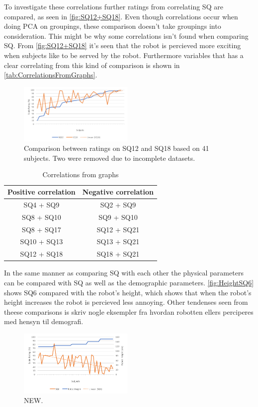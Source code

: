 To investigate these correlations further ratings from correlating SQ are compared, as seen in \autoref{fig:SQ12+SQ18}. Even though correlations occur when doing PCA on groupings, these comparison doesn't take groupings into consideration. This might be why some correlations isn't found when comparing SQ. From \autoref{fig:SQ12+SQ18} it's seen that the robot is percieved more exciting when subjects like to be served by the robot. Furthermore variables that has a clear correlating from this kind of comparison is shown in \autoref{tab:CorrelationsFromGraphs}.
%
\begin{figure}[H]
	\centering
	\includegraphics[width = 0.49\textwidth]{Figure/SQ12+SQ18}
	\setlength{} 
	\caption{Comparison between ratings on SQ12 and SQ18 based on 41 subjects. Two were removed due to incomplete datasets.}
	\label{fig:SQ12+SQ18}
\end{figure}
\noindent
%
\begin{table}
	\centering
	\caption{Correlations from graphs}
	\label{tab:CorrelationsFromGraphs} 
	\begin{tabular}{ c|c }
		\centering
		Positive correlation & Negative correlation \\ \hline
		SQ4 + SQ9 & SQ2 + SQ9 \\ 
		SQ8 + SQ10 & SQ9 + SQ10 \\ 
		SQ8 + SQ17 & SQ12 + SQ21 \\ 
		SQ10 + SQ13 & SQ13 + SQ21 \\ 
		SQ12 + SQ18 & SQ18 + SQ21		
	\end{tabular}        
\end{table}
\noindent
%

In the same manner as comparing SQ with each other the physical parameters can be compared with SQ as well as the demographic parameters. \autoref{fig:HeightSQ6} shows SQ6 compared with the robot's height, which shows that when the robot's height increases the robot is percieved less annoying. Other tendenses seen from theese comparisons is {\color{red} skriv nogle eksempler fra hvordan robotten ellers perciperes med hensyn til demografi.}
%
\begin{figure}[H]
	\centering
	\includegraphics[width = 0.49\textwidth]{Figure/HeightSQ6}
	\setlength{} 
	\caption{NEW.}
	\label{fig:HeightSQ6}
\end{figure}
\noindent
%